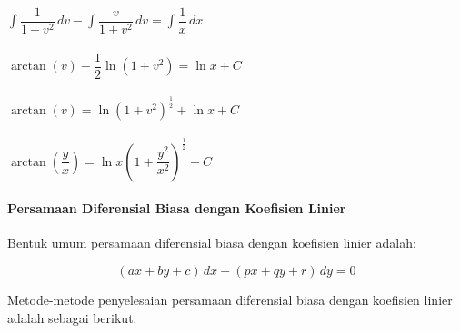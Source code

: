 \begin{enumerate}[1.]
                    \begin{math} \int \dfrac{1}{1 + v^{2}} \, dv - \int \dfrac{v}{1 + v^{2}} \, dv = \int \dfrac{1}{x} \, dx \end{math}\\ \\
	         \begin{math} \arctan(v) - \dfrac{1}{2} \ln (1 + v^{2}) = \ln x + C \end{math} \\ \\
                    \begin{math} \arctan(v) = \ln (1 + v^{2})^{\frac{1}{2}} + \ln x + C \end{math} \\ \\
                    \begin{math} \arctan(\dfrac{y}{x}) = \ln x (1 + \dfrac{y^{2}}{x^{2}})^{\frac{1}{2}} + C \end{math} 

\end{enumerate}

\paragraph{Persamaan Diferensial Biasa dengan Koefisien Linier}
\label{par:PDBKL}

Bentuk umum persamaan diferensial biasa dengan koefisien linier adalah:

\begin{equation} (ax + by + c) \, dx + (px + qy + r) \, dy = 0 \end{equation}

Metode-metode penyelesaian  persamaan diferensial biasa dengan koefisien linier adalah sebagai berikut:

